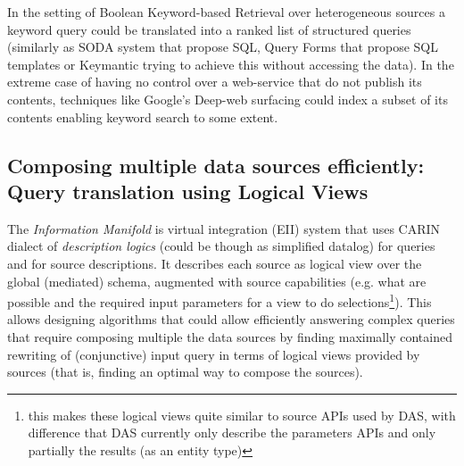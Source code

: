 In the setting of Boolean Keyword-based Retrieval over heterogeneous sources a keyword query could be translated into a ranked list of structured queries (similarly as SODA system that propose SQL, Query Forms that propose SQL templates or Keymantic trying to achieve this without accessing the data).
In the extreme case of having no control over a web-service that do not publish its contents, techniques like Google's Deep-web surfacing could index a subset of its contents enabling keyword search to some extent.

\subsection{Composing multiple data sources efficiently: Query translation using Logical Views\label{IM_query_translation}}
The \textit{Information Manifold}\cite{Levy96} is virtual integration (EII) system that uses CARIN dialect of \textit{description logics} (could be though as simplified datalog) for queries and for source descriptions. It describes each source as logical view over the global (mediated) schema, augmented with source capabilities (e.g. what are possible and the required input parameters for a view to do selections\footnote{this makes these logical views quite similar to source APIs used by DAS, with difference that DAS currently only describe the parameters APIs and only partially the results (as an entity type)}).
%
This allows designing algorithms that could allow efficiently answering complex queries that require composing multiple the data sources by finding maximally contained rewriting of (conjunctive) input query in terms of logical views provided by sources (that is, finding an optimal way to compose the sources).

